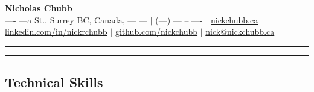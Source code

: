 \documentclass[11pt,a4paper]{article}
\begin{document}
 

\begin{center}

{\Huge \textbf{Nicholas Chubb}}
\vspace{1em}
\\
{\small
{{ }\faHome { }---- ---a St., Surrey BC, Canada, --- ---} $|$ 
{{ }\faPhoneSquare { } (---) --- -- ----} $|$ 
{{ }\faUser { } \href{https://nickchubb.ca/}{nickchubb.ca}}  \\
\vspace{.3em}
{{ }\faLinkedinSquare { } \href{https://linkedin.com/in/nickrchubb}{linkedin.com/in/nickrchubb}} $|$ 
{{ }\faGithub { } \href{https://github.com/NickChubb}{github.com/nickchubb}} $|$ 
{{ }\faEnvelope { } \href{mailto:nick@nickchubb.ca}{nick@nickchubb.ca}}\\ \vspace{.2em}
}
\end{center}

\hrule
\hrule
\vspace{-0.5em}


\subsection*{Technical Skills}

\vspace{-0.2em}
\end{document}
